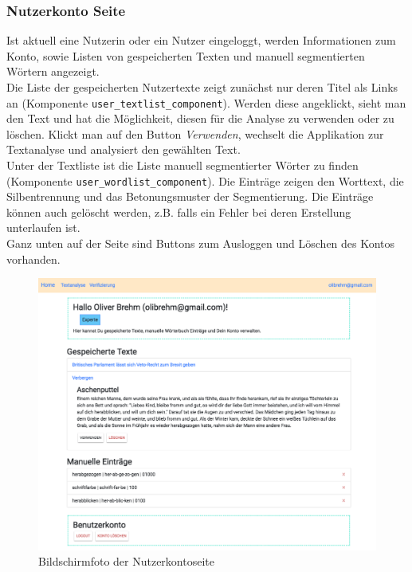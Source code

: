 \subsubsection{Nutzerkonto Seite}

Ist aktuell eine Nutzerin oder ein Nutzer eingeloggt, werden Informationen zum Konto, sowie Listen von gespeicherten Texten und manuell segmentierten Wörtern angezeigt.\\

Die Liste der gespeicherten Nutzertexte zeigt zunächst nur deren Titel als Links an (Komponente \texttt{user\_textlist\_component}). Werden diese angeklickt, sieht man den Text und hat die Möglichkeit, diesen für die Analyse zu verwenden oder zu löschen. Klickt man auf den Button \textit{Verwenden}, wechselt die Applikation zur Textanalyse und analysiert den gewählten Text. \\

Unter der Textliste ist die Liste manuell segmentierter Wörter zu finden (Komponente \texttt{user\_wordlist\_component}). Die Einträge zeigen den Worttext, die Silbentrennung und das Betonungsmuster der Segmentierung. Die Einträge können auch gelöscht werden, z.B. falls ein Fehler bei deren Erstellung unterlaufen ist.\\

Ganz unten auf der Seite sind Buttons zum Ausloggen und Löschen des Kontos vorhanden.

\begin{figure}[h!]
	\centering
	\includegraphics[width=.8\linewidth, frame]{figures/frontend/user-account}
	\caption{Bildschirmfoto der Nutzerkontoseite}
	\label{fig:frontend-useraccount}
\end{figure}

